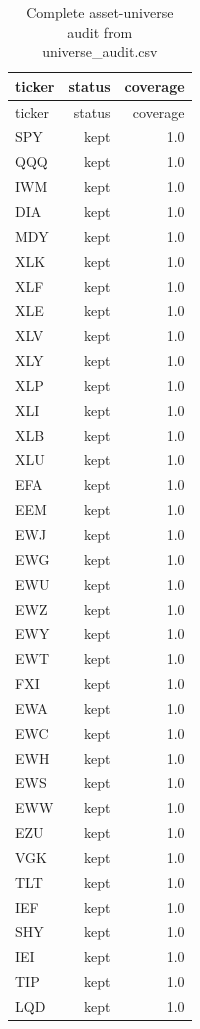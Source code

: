 \documentclass[10pt]{article}
\begin{document}
\begingroup\scriptsize\setlength{\tabcolsep}{3pt}
\begin{longtable}{lrr}
\caption{Complete asset-universe audit from universe\_audit.csv}\label{tab:universeaudit}\\
\toprule
ticker & status & coverage \\
\midrule
\endfirsthead
\toprule
ticker & status & coverage \\
\midrule
\endhead
SPY & kept & 1.0 \\
QQQ & kept & 1.0 \\
IWM & kept & 1.0 \\
DIA & kept & 1.0 \\
MDY & kept & 1.0 \\
XLK & kept & 1.0 \\
XLF & kept & 1.0 \\
XLE & kept & 1.0 \\
XLV & kept & 1.0 \\
XLY & kept & 1.0 \\
XLP & kept & 1.0 \\
XLI & kept & 1.0 \\
XLB & kept & 1.0 \\
XLU & kept & 1.0 \\
EFA & kept & 1.0 \\
EEM & kept & 1.0 \\
EWJ & kept & 1.0 \\
EWG & kept & 1.0 \\
EWU & kept & 1.0 \\
EWZ & kept & 1.0 \\
EWY & kept & 1.0 \\
EWT & kept & 1.0 \\
FXI & kept & 1.0 \\
EWA & kept & 1.0 \\
EWC & kept & 1.0 \\
EWH & kept & 1.0 \\
EWS & kept & 1.0 \\
EWW & kept & 1.0 \\
EZU & kept & 1.0 \\
VGK & kept & 1.0 \\
TLT & kept & 1.0 \\
IEF & kept & 1.0 \\
SHY & kept & 1.0 \\
IEI & kept & 1.0 \\
TIP & kept & 1.0 \\
LQD & kept & 1.0 \\

\end{longtable}
\end{document}
